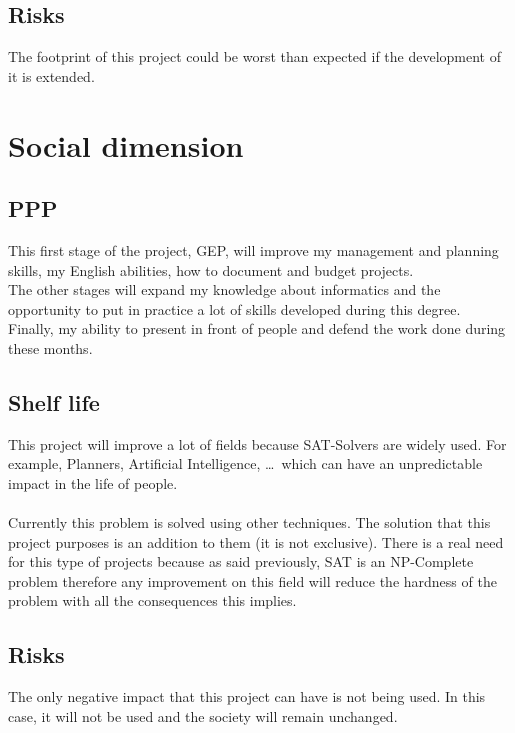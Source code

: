 \subsection{Risks} 
The footprint of this project could be worst than expected if the development of it is extended.

\section{Social dimension}
\subsection{PPP}
This first stage of the project, GEP, will improve my management and planning skills, my English abilities, how to document and budget projects.\\
The other stages will expand my knowledge about informatics and the opportunity to put in practice a lot of skills developed during this degree. \\
Finally, my ability to present in front of people and defend the work done during these months.

\subsection{Shelf life}
This project will improve a lot of fields because SAT-Solvers are widely used. For example, Planners, Artificial Intelligence, \ldots \ which can have an unpredictable impact in the life of people.\\\\
Currently this problem is solved using other techniques. The solution that this project purposes is an addition to them (it is not exclusive). There is a real need for this type of projects because as said previously, SAT is an NP-Complete problem therefore any improvement on this field will reduce the hardness of the problem with all the consequences this implies.
\subsection{Risks}
The only negative impact that this project can have is not being used. In this case, it will not be used and the society will remain unchanged.

